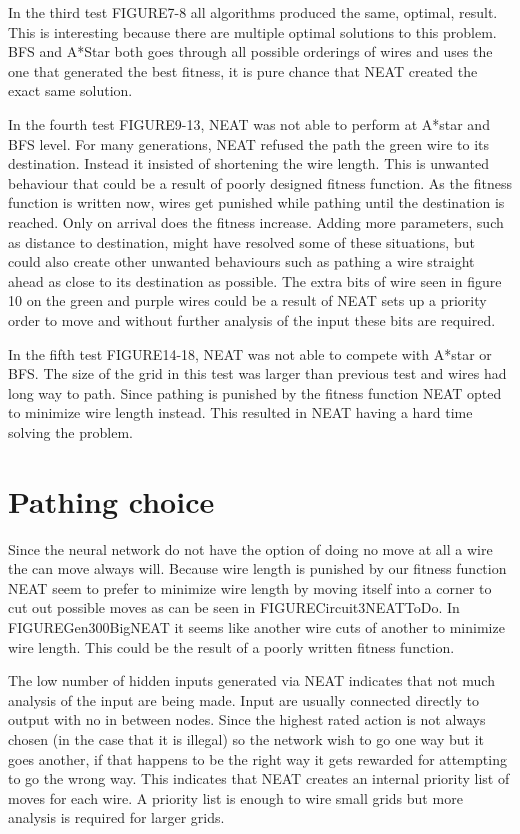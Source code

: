 \documentclass{kththesis}
\begin{document}
In the third test FIGURE7-8 all algorithms produced the same, optimal, result. This is interesting because there are multiple optimal solutions to this problem. BFS and A*Star both goes through all possible orderings of wires and uses the one that generated the best fitness, it is pure chance that NEAT created the exact same solution. 

In the fourth test FIGURE9-13, NEAT was not able to perform at A*star and BFS level. For many generations, NEAT refused the path the green wire to its destination. Instead it insisted of shortening the wire length. This is unwanted behaviour that could be a result of poorly designed fitness function. As the fitness function is written now, wires get punished while pathing until the destination is reached. Only on arrival does the fitness increase. Adding more parameters, such as distance to destination, might have resolved some of these situations, but could also create other unwanted behaviours such as pathing a wire straight ahead as close to its destination as possible. The extra bits of wire seen in figure 10 on the green and purple wires could be a result of NEAT sets up a priority order to move and without further analysis of the input these bits are required.

In the fifth test FIGURE14-18, NEAT was not able to compete with A*star or BFS. The size of the grid in this test was larger than previous test and wires had long way to path. Since pathing is punished by the fitness function NEAT opted to minimize wire length instead. This resulted in NEAT having a hard time solving the problem. 

\section{Pathing choice}
Since the neural network do not have the option of doing no move at all a wire the can move always will. Because wire length is punished by our fitness function NEAT seem to prefer to minimize wire length by moving itself into a corner to cut out possible moves as can be seen in FIGURECircuit3NEATToDo. In FIGUREGen300BigNEAT it seems like another wire cuts of another to minimize wire length. This could be the result of a poorly written fitness function.

The low number of hidden inputs generated via NEAT indicates that not much analysis of the input are being made. Input are usually connected directly to output with no in between nodes. Since the highest rated action is not always chosen (in the case that it is illegal) so the network wish to go one way but it goes another, if that happens to be the right way it gets rewarded for attempting to go the wrong way. This indicates that NEAT creates an internal priority list of moves for each wire. A priority list is enough to wire small grids but more analysis is required for larger grids.


\printbibliography[heading=bibintoc] %
\end{document}
